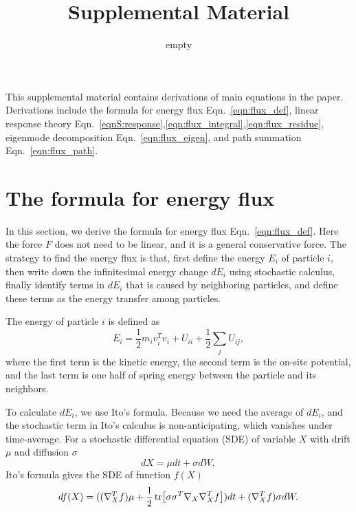 \documentclass[
 amsmath,amssymb,
 aps,
 pre,
 longbibliography,
 10pt, onecolumn,
 notitlepage
]{revtex4-1}
\begin{document}
\newcommand{\eqnname}{Eqn.}
\renewcommand{\theequation}{S\arabic{equation}}
\renewcommand{\thefigure}{S\arabic{figure}}
\renewcommand{\bibnumfmt}[1]{[S#1]}
\renewcommand{\citenumfont}[1]{S#1}

\title{Supplemental Material}

\author{empty}

\maketitle

This supplemental material contains derivations of main equations in the paper. Derivations include the formula for energy flux \eqnname~\eqref{eqn:flux_def}, linear response theory \eqnname~\eqref{eqnS:response},\eqref{eqn:flux_integral},\eqref{eqn:flux_residue}, eigenmode decomposition \eqnname~\eqref{eqn:flux_eigen}, and path summation \eqnname~\eqref{eqn:flux_path}.

\section{The formula for energy flux}
In this section, we derive the formula for energy flux \eqnname~\eqref{eqn:flux_def}.
Here the force $F$ does not need to be linear, and it is a general conservative force.
The strategy to find the energy flux is that, first define the energy $E_i$ of particle $i$, then write down the infinitesimal energy change $dE_i$ using stochastic calculus, finally identify terms in $dE_i$ that is caused by neighboring particles, and define these terms as the energy transfer among particles.

The energy of particle $i$ is defined as
\begin{equation} \label{eqnS:energy_individual}
E_i = \frac{1}{2}m_iv_i^Tv_i + U_{ii} + \frac{1}{2}\sum_jU_{ij},
\end{equation}
where the first term is the kinetic energy, the second term is the on-site potential, and the last term is one half of spring energy between the particle and its neighbors.

To calculate $dE_i$, we use Ito's formula. Because we need the average of $dE_i$, and the stochastic term in Ito's calculus is non-anticipating, which vanishes under time-average.
For a stochastic differential equation (SDE) of variable $X$ with drift $\mu$ and diffusion $\sigma$
\begin{equation} \label{eqnS:SDE_general}
dX = \mu dt + \sigma dW ,
\end{equation}
Ito's formula gives the SDE of function $f(X)$
\begin{equation} \label{eqnS:SDE_ito}
df(X) = ((\nabla_X^Tf)\mu + \frac{1}{2}\tr[\sigma \sigma^T \nabla_X\nabla_X^Tf])dt + (\nabla_X^Tf) \sigma dW .
\end{equation}
\end{document}

